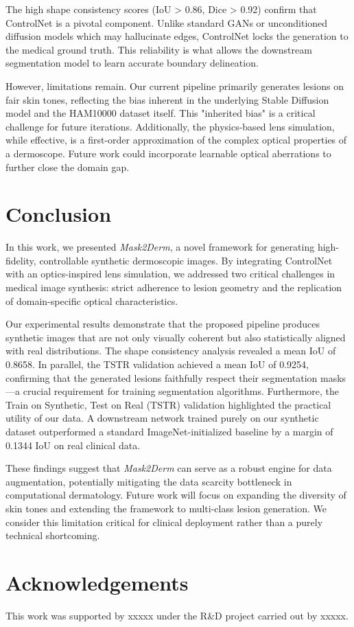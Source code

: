 \documentclass[a4paper,11pt]{article}
\begin{document}
The high shape consistency scores (IoU > 0.86, Dice > 0.92) confirm that ControlNet is a pivotal component. Unlike standard GANs or unconditioned diffusion models which may hallucinate edges, ControlNet locks the generation to the medical ground truth. This reliability is what allows the downstream segmentation model to learn accurate boundary delineation.

However, limitations remain. Our current pipeline primarily generates lesions on fair skin tones, reflecting the bias inherent in the underlying Stable Diffusion model and the HAM10000 dataset itself. This "inherited bias" is a critical challenge for future iterations. Additionally, the physics-based lens simulation, while effective, is a first-order approximation of the complex optical properties of a dermoscope. Future work could incorporate learnable optical aberrations to further close the domain gap.

\section{Conclusion}
In this work, we presented \textit{Mask2Derm}, a novel framework for generating high-fidelity, controllable synthetic dermoscopic images. By integrating ControlNet with an optics-inspired lens simulation, we addressed two critical challenges in medical image synthesis: strict adherence to lesion geometry and the replication of domain-specific optical characteristics.

Our experimental results demonstrate that the proposed pipeline produces synthetic images that are not only visually coherent but also statistically aligned with real distributions. The shape consistency analysis revealed a mean IoU of 0.8658. In parallel, the TSTR validation achieved a mean IoU of 0.9254, confirming that the generated lesions faithfully respect their segmentation masks—a crucial requirement for training segmentation algorithms. Furthermore, the Train on Synthetic, Test on Real (TSTR) validation highlighted the practical utility of our data. A downstream network trained purely on our synthetic dataset outperformed a standard ImageNet-initialized baseline by a margin of 0.1344 IoU on real clinical data.

These findings suggest that \textit{Mask2Derm} can serve as a robust engine for data augmentation, potentially mitigating the data scarcity bottleneck in computational dermatology. Future work will focus on expanding the diversity of skin tones and extending the framework to multi-class lesion generation. We consider this limitation critical for clinical deployment rather than a purely technical shortcoming.

\section*{Acknowledgements}
This work was supported by xxxxx under the R\&D project carried out by xxxxx.

\clearpage


\end{document}
